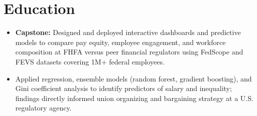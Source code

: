\section{Education}

\begin{itemize}
\item \textbf{Capstone:} Designed and deployed interactive dashboards and predictive models to compare pay equity, employee engagement, and workforce composition at FHFA versus peer financial regulators using FedScope and FEVS datasets covering 1M+ federal employees.
\item Applied regression, ensemble models (random forest, gradient boosting), and Gini coefficient analysis to identify predictors of salary and inequality; findings directly informed union organizing and bargaining strategy at a U.S. regulatory agency.
\end{itemize}

